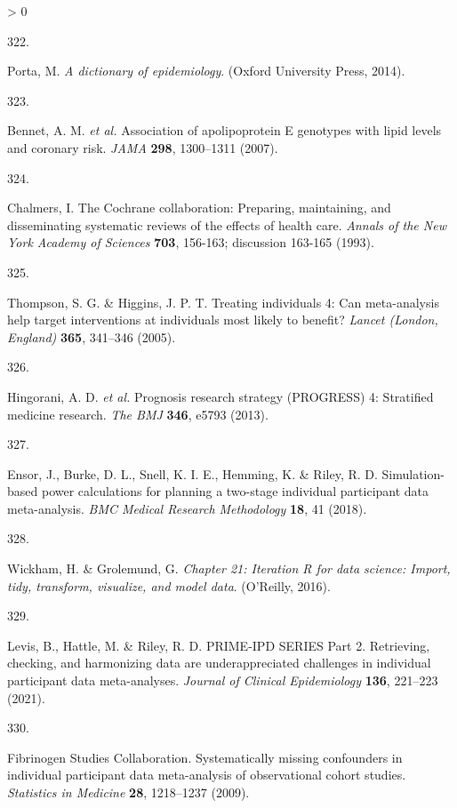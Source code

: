 \documentclass[a4paper, twoside]{templates/ociamthesis}
\newlength{\cslhangindent}
\newlength{\csllabelwidth}
\newenvironment{CSLReferences}[3] %
 {%
  \setlength{\parindent}{0pt}
  \ifodd #1 \everypar{\setlength{\hangindent}{\cslhangindent}}\ignorespaces\fi
  \ifnum #2 > 0
  \setlength{\parskip}{#2\baselineskip}
  \fi
 }%
 {}
\newcommand{\CSLLeftMargin}[1]{\parbox[t]{\maxof{\widthof{#1}}{\csllabelwidth}}{#1}}
\newcommand{\CSLRightInline}[1]{\parbox[t]{\linewidth - \csllabelwidth}{#1}}
\begin{document}
\begin{CSLReferences}{0}{0}
\leavevmode\hypertarget{ref-porta2014}{}%
\CSLLeftMargin{322. }
\CSLRightInline{Porta, M. \emph{A dictionary of epidemiology}. ({Oxford University Press}, 2014).}

\leavevmode\hypertarget{ref-bennet2007}{}%
\CSLLeftMargin{323. }
\CSLRightInline{Bennet, A. M. \emph{et al.} Association of apolipoprotein {E} genotypes with lipid levels and coronary risk. \emph{JAMA} \textbf{298}, 1300--1311 (2007).}

\leavevmode\hypertarget{ref-chalmers1993}{}%
\CSLLeftMargin{324. }
\CSLRightInline{Chalmers, I. The {Cochrane} collaboration: Preparing, maintaining, and disseminating systematic reviews of the effects of health care. \emph{Annals of the New York Academy of Sciences} \textbf{703}, 156-163; discussion 163-165 (1993).}

\leavevmode\hypertarget{ref-thompson2005}{}%
\CSLLeftMargin{325. }
\CSLRightInline{Thompson, S. G. \& Higgins, J. P. T. Treating individuals 4: Can meta-analysis help target interventions at individuals most likely to benefit? \emph{Lancet (London, England)} \textbf{365}, 341--346 (2005).}

\leavevmode\hypertarget{ref-hingorani2013}{}%
\CSLLeftMargin{326. }
\CSLRightInline{Hingorani, A. D. \emph{et al.} Prognosis research strategy ({PROGRESS}) 4: Stratified medicine research. \emph{The BMJ} \textbf{346}, e5793 (2013).}

\leavevmode\hypertarget{ref-ensor2018}{}%
\CSLLeftMargin{327. }
\CSLRightInline{Ensor, J., Burke, D. L., Snell, K. I. E., Hemming, K. \& Riley, R. D. Simulation-based power calculations for planning a two-stage individual participant data meta-analysis. \emph{BMC Medical Research Methodology} \textbf{18}, 41 (2018).}

\leavevmode\hypertarget{ref-wickham2016func}{}%
\CSLLeftMargin{328. }
\CSLRightInline{Wickham, H. \& Grolemund, G. \emph{Chapter 21: Iteration \textbar{} {R} for data science: Import, tidy, transform, visualize, and model data}. ({O'Reilly}, 2016).}

\leavevmode\hypertarget{ref-levis2021}{}%
\CSLLeftMargin{329. }
\CSLRightInline{Levis, B., Hattle, M. \& Riley, R. D. {PRIME}-{IPD SERIES Part} 2. {Retrieving}, checking, and harmonizing data are underappreciated challenges in individual participant data meta-analyses. \emph{Journal of Clinical Epidemiology} \textbf{136}, 221--223 (2021).}

\leavevmode\hypertarget{ref-fibrinogenstudiescollaboration2009}{}%
\CSLLeftMargin{330. }
\CSLRightInline{Fibrinogen Studies Collaboration. Systematically missing confounders in individual participant data meta-analysis of observational cohort studies. \emph{Statistics in Medicine} \textbf{28}, 1218--1237 (2009).}


\end{CSLReferences}
\end{document}
